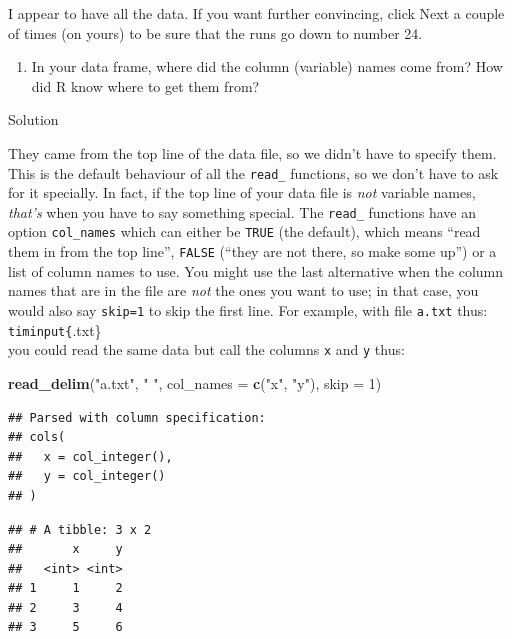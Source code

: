 \documentclass[]{tufte-book}
\newenvironment{Shaded}{}{}
\newcommand{\DataTypeTok}[1]{\textcolor[rgb]{0.56,0.13,0.00}{#1}}
\newcommand{\DecValTok}[1]{\textcolor[rgb]{0.25,0.63,0.44}{#1}}
\newcommand{\KeywordTok}[1]{\textcolor[rgb]{0.00,0.44,0.13}{\textbf{#1}}}
\newcommand{\NormalTok}[1]{#1}
\newcommand{\StringTok}[1]{\textcolor[rgb]{0.25,0.44,0.63}{#1}}
\providecommand{\tightlist}{%
  \setlength{\itemsep}{0pt}\setlength{\parskip}{0pt}}
\theoremstyle{definition}
\theoremstyle{definition}
\theoremstyle{definition}
\theoremstyle{remark}
\begin{document}
I appear to have all the data. If you want further convincing, click
Next a couple of times (on yours) to be sure that the runs go down to
number 24.

\begin{enumerate}
\def\labelenumi{(\alph{enumi})}
\setcounter{enumi}{2}
\tightlist
\item
  In your data frame, where did the column (variable) names come from?
  How did R know where to get them from?
\end{enumerate}

Solution

They came from the top line of the data file, so we didn't have to
specify them. This is the default behaviour of all the \texttt{read\_}
functions, so we don't have to ask for it specially. In fact, if the top
line of your data file is \emph{not} variable names, \emph{that's} when
you have to say something special. The \texttt{read\_} functions have an
option \texttt{col\_names} which can either be \texttt{TRUE} (the
default), which means ``read them in from the top line'', \texttt{FALSE}
(``they are not there, so make some up'') or a list of column names to
use. You might use the last alternative when the column names that are
in the file are \emph{not} the ones you want to use; in that case, you
would also say \texttt{skip=1} to skip the first line. For example, with
file \texttt{a.txt} thus: \texttt{timinput\{}.txt\}\\
you could read the same data but call the columns \texttt{x} and
\texttt{y} thus:

\begin{Shaded}
\begin{Highlighting}[]
\KeywordTok{read_delim}\NormalTok{(}\StringTok{"a.txt"}\NormalTok{, }\StringTok{" "}\NormalTok{, }\DataTypeTok{col_names =} \KeywordTok{c}\NormalTok{(}\StringTok{"x"}\NormalTok{, }\StringTok{"y"}\NormalTok{), }
    \DataTypeTok{skip =} \DecValTok{1}\NormalTok{)}
\end{Highlighting}
\end{Shaded}

\begin{verbatim}
## Parsed with column specification:
## cols(
##   x = col_integer(),
##   y = col_integer()
## )
\end{verbatim}

\begin{verbatim}
## # A tibble: 3 x 2
##       x     y
##   <int> <int>
## 1     1     2
## 2     3     4
## 3     5     6
\end{verbatim}
\end{document}
